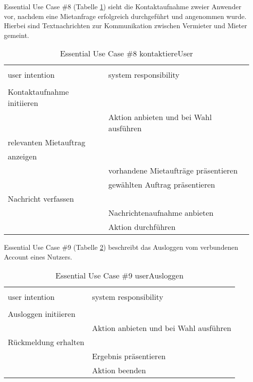 \newpage
Essential Use Case \#8 (Tabelle \ref{tab:kontaktaufnahme}) sieht die Kontaktaufnahme zweier Anwender vor, nachdem eine Mietanfrage erfolgreich durchgeführt und angenommen wurde. Hierbei sind Textnachrichten zur Kommunikation zwischen Vermieter und Mieter gemeint.
\begin{table}[H]
\caption{Essential Use Case \#8 kontaktiereUser }
\centering
\begin{tabular}{l l}
\\ [-0.5ex]

\hline\hline
\\ [-0.5ex]
user intention & system responsibility
\\ [1.5ex]
\hline
\\ [-0.5ex]
Kontaktaufnahme initiieren &                                 \\[1ex]
                     & Aktion anbieten und bei Wahl ausführen   \\[1ex]
relevanten Mietauftrag     &                                 \\[1ex] 
anzeigen             &                                 \\[1ex] 
                     & vorhandene Mietaufträge präsentieren        \\[1ex]
                     & gewählten Auftrag präsentieren        \\[1ex]
Nachricht verfassen        &                                 \\[1ex]
                     & Nachrichtenaufnahme anbieten             \\[1ex]
                     & Aktion durchführen                 \\[1ex]
\hline
\end{tabular}
\label{tab:kontaktaufnahme}
\end{table}


\newpage
Essential Use Case \#9 (Tabelle \ref{tab:ausloggen}) beschreibt das Ausloggen vom verbundenen Account eines Nutzers.
\begin{table}[H]
\caption{Essential Use Case \#9 userAusloggen }
\centering
\begin{tabular}{l l}
\\ [-0.5ex]

\hline\hline
\\ [-0.5ex]
user intention & system responsibility
\\ [1.5ex]
\hline
\\ [-0.5ex]
Ausloggen initiieren    &                                 \\[1ex]
                     & Aktion anbieten und bei Wahl ausführen   \\[1ex]
Rückmeldung erhalten    &                                 \\[1ex]
                     & Ergebnis präsentieren                 \\[1ex]
                     & Aktion beenden                     \\[1ex]

\hline
\end{tabular}
\label{tab:ausloggen}
\end{table}



